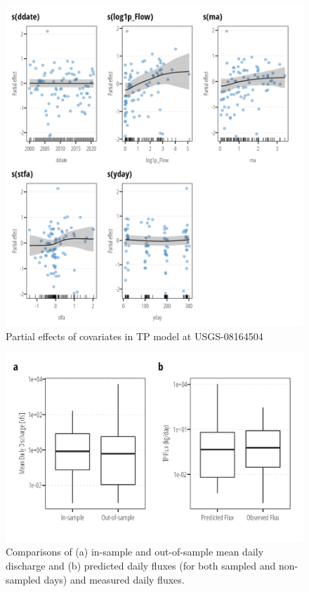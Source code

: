 \documentclass[
]{article}
\begin{document}
\begin{figure}[h]

{\centering \includegraphics{model_assessment_files/figure-pdf/unnamed-chunk-47-1.png}

}

\caption{Partial effects of covariates in TP model at USGS-08164504}

\end{figure}

\begin{figure}[h]

{\centering \includegraphics{model_assessment_files/figure-pdf/unnamed-chunk-48-1.png}

}

\caption{Comparisons of (a) in-sample and out-of-sample mean daily
discharge and (b) predicted daily fluxes (for both sampled and
non-sampled days) and measured daily fluxes.}

\end{figure}
\end{document}
